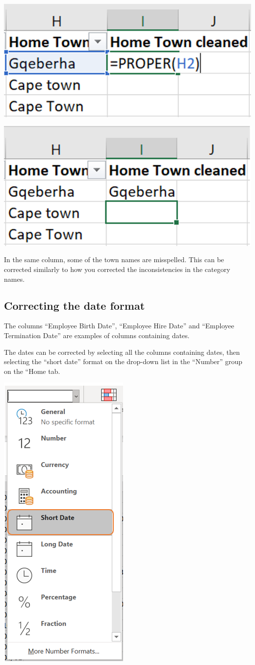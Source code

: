\documentclass[
]{book}
\begin{document}
\begin{center}\includegraphics[width=0.4\linewidth]{Figures/capitals_5} \end{center}

\begin{center}\includegraphics[width=0.4\linewidth]{Figures/capitals_6} \end{center}

In the same column, some of the town names are misspelled. This can be corrected similarly to how you corrected the inconsistencies in the category names.

\subsection*{Correcting the date format}\label{correcting-the-date-format}

The columns ``Employee Birth Date'', ``Employee Hire Date'' and ``Employee Termination Date'' are examples of columns containing dates.

The dates can be corrected by selecting all the columns containing dates, then selecting the ``short date'' format on the drop-down list in the ``Number'' group on the ``Home tab.

\begin{center}\includegraphics[width=0.4\linewidth]{Figures/dates} \end{center}
\end{document}

